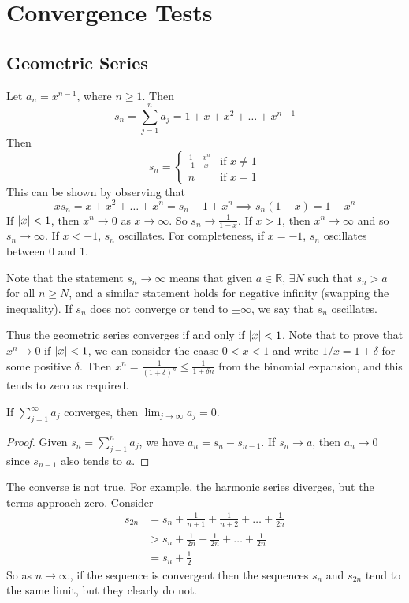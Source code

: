 \documentclass{article}
\begin{document}
\section{Convergence Tests}
\subsection{Geometric Series}
Let $a_n = x^{n-1}$, where $n \geq 1$. Then
\[ s_n = \sum_{j=1}^n a_j = 1 + x + x^2 + \dots + x^{n-1} \]
Then
\[ s_n = \begin{cases}
        \frac{1 - x^n}{1 - x} & \text{if } x \neq 1 \\
        n                     & \text{if } x = 1
    \end{cases} \]
This can be shown by observing that
\[ x s_n = x + x^2 + \dots + x^n = s_n - 1 + x^n \implies s_n(1-x) = 1-x^n \]
If $\abs{x} < 1$, then $x^n \to 0$ as $x \to \infty$. So $s_n \to \frac{1}{1-x}$. If $x > 1$, then $x^n \to \infty$ and so $s_n \to \infty$. If $x < -1$, $s_n$ oscillates. For completeness, if $x=-1$, $s_n$ oscillates between 0 and 1.

Note that the statement $s_n \to \infty$ means that given $a \in \mathbb R$, $\exists N$ such that $s_n > a$ for all $n \geq N$, and a similar statement holds for negative infinity (swapping the inequality). If $s_n$ does not converge or tend to $\pm \infty$, we say that $s_n$ oscillates.

Thus the geometric series converges if and only if $\abs{x} < 1$. Note that to prove that $x^n \to 0$ if $\abs{x} < 1$, we can consider the caase $0 < x < 1$ and write $1/x = 1 + \delta$ for some positive $\delta$. Then $x^n = \frac{1}{(1 + \delta)^n} \leq \frac{1}{1 + \delta n}$ from the binomial expansion, and this tends to zero as required.

\begin{lemma}
    If $\sum_{j=1}^\infty a_j$ converges, then $\lim_{j \to \infty} a_j = 0$.
\end{lemma}
\begin{proof}
    Given $s_n = \sum_{j=1}^n a_j$, we have $a_n = s_n - s_{n-1}$. If $s_n \to a$, then $a_n \to 0$ since $s_{n-1}$ also tends to $a$.
\end{proof}
\begin{remark}
    The converse is not true. For example, the harmonic series diverges, but the terms approach zero. Consider
    \begin{align*}
        s_{2n} & = s_n + \frac{1}{n+1} + \frac{1}{n+2} + \dots + \frac{1}{2n} \\
               & > s_n + \frac{1}{2n} + \frac{1}{2n} + \dots + \frac{1}{2n}   \\
               & = s_n + \frac{1}{2}
    \end{align*}
    So as $n \to \infty$, if the sequence is convergent then the sequences $s_n$ and $s_{2n}$ tend to the same limit, but they clearly do not.
\end{remark}
\end{document}
